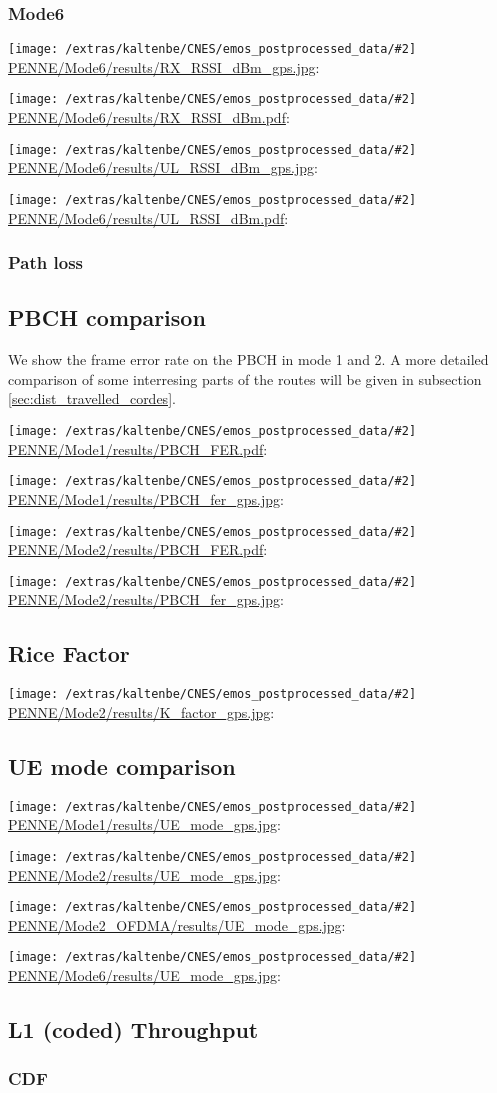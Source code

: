 \documentclass[a4paper,10pt]{article}
\newcommand{\printfile}[2][]{
 \begin{minipage}{8cm}
  \centering
  \texttt{[image: /extras/kaltenbe/CNES/emos\_postprocessed\_data/\#2]}
  \url{#2}: #1

 \end{minipage}
}
\begin{document}
\subsubsection{Mode6}
\printfile{PENNE/Mode6/results/RX_RSSI_dBm_gps.jpg}
\printfile{PENNE/Mode6/results/RX_RSSI_dBm.pdf}

\printfile{PENNE/Mode6/results/UL_RSSI_dBm_gps.jpg}
\printfile{PENNE/Mode6/results/UL_RSSI_dBm.pdf}

\subsubsection{Path loss}


\subsection{PBCH comparison}
We show the frame error rate on the PBCH in mode 1 and 2. A more detailed comparison of some interresing parts of the routes will be given in subsection \ref{sec:dist_travelled_cordes}.

\printfile{PENNE/Mode1/results/PBCH_FER.pdf}
\printfile{PENNE/Mode1/results/PBCH_fer_gps.jpg}

\printfile{PENNE/Mode2/results/PBCH_FER.pdf}
\printfile{PENNE/Mode2/results/PBCH_fer_gps.jpg}

\subsection{Rice Factor}

\printfile{PENNE/Mode2/results/K_factor_gps.jpg}

\subsection{UE mode comparison}

\printfile{PENNE/Mode1/results/UE_mode_gps.jpg}
\printfile{PENNE/Mode2/results/UE_mode_gps.jpg}

\printfile{PENNE/Mode2_OFDMA/results/UE_mode_gps.jpg}
\printfile{PENNE/Mode6/results/UE_mode_gps.jpg}

\subsection{L1 (coded) Throughput}


\subsubsection{CDF}
\end{document}

